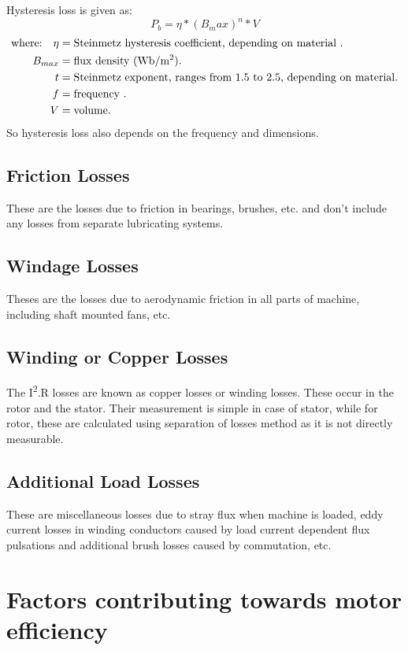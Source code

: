 Hysteresis loss is given as:
\begin{equation}
P_b= \eta * (B_max)^n * V
\end{equation}
\begin{align*}
\text{where:}\quad
 \eta    &=  \text{Steinmetz hysteresis coefficient, depending on material .} \\
 B_{max}    &=  \text{flux density (Wb/m\textsuperscript{2}).} \\
 t    &=  \text{Steinmetz exponent, ranges from 1.5 to 2.5, depending on material.} \\
 f    &=  \text{frequency .} \\
 V    &=  \text{volume.} \\
\end{align*}
So hysteresis loss also depends on the frequency and dimensions.

\subsection{Friction Losses}
These are the losses due to friction in bearings, brushes, etc. and don't include any losses from separate lubricating systems.

\subsection{Windage Losses}
Theses are the losses due to aerodynamic friction in all parts of machine, including shaft mounted fans, etc.

\subsection{Winding or Copper Losses}
The I\textsuperscript{2}.R losses are known as copper losses or winding losses. These occur in the rotor and the stator. Their measurement is simple in case of stator, while for rotor, these are calculated using separation of losses method as it is not directly measurable.

\subsection{Additional Load Losses}
These are miscellaneous losses due to stray flux when machine is loaded, eddy current losses in winding conductors caused by load current dependent flux pulsations and additional brush losses caused by commutation, etc.

\section{Factors contributing towards motor efficiency}
